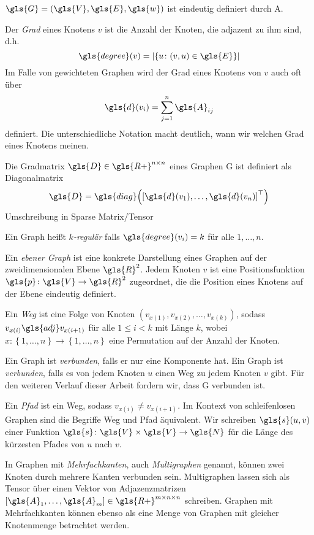 $\gls{G} = \left(\gls{V}, \gls{E}, \gls{w}\right)$ ist eindeutig definiert durch \gls{A}.

Der \emph{Grad} eines Knotens $v$ ist die Anzahl der Knoten, die adjazent zu ihm sind, d.h.
\begin{equation}
  \gls{degree}(v) = \left|\left\{ u \colon \left(v, u\right) \in \gls{E} \right\}\right|
\end{equation}
Im Falle von gewichteten Graphen wird der Grad eines Knotens von $v$ auch oft über
\begin{equation}
  \gls{d}\left(v_i\right) = \sum^n_{j=1} \gls{A}_{ij}
\end{equation}
definiert.
Die unterschiedliche Notation macht deutlich, wann wir welchen Grad eines Knotens meinen.

Die Gradmatrix $\gls{D} \in \gls{R+}^{n \times n}$ eines Graphen \gls{G} ist definiert als Diagonalmatrix
\begin{equation}
  \gls{D} = \gls{diag}\left( {\left[ \gls{d}\left(v_1\right), \ldots, \gls{d}\left(v_n\right) \right]}^{\top} \right)
\end{equation}
Umschreibung in Sparse Matrix/Tensor

Ein Graph heißt \emph{$k$-regulär} falls $\gls{degree}\left(v_i\right) = k$ für alle $1, \ldots, n$.

Ein \emph{ebener Graph} ist eine konkrete Darstellung eines Graphen auf der zweidimensionalen Ebene $\gls{R}^2$.
Jedem Knoten $v$ ist eine Positionsfunktion $\gls{p} \colon \gls{V} \to \gls{R}^2$ zugeordnet, die die Position eines Knotens auf der Ebene eindeutig definiert.

Ein \emph{Weg} ist eine Folge von Knoten $\left( v_{x\left(1\right)}, v_{x\left(2\right)}, \ldots, v_{x\left(k\right)} \right)$, sodass $v_{x\left(i\right)} \gls{adj} v_{x\left(i+1\right)}$ für alle $1 \leq i < k$ mit Länge $k$, wobei $x \colon \left\{ 1, \ldots, n \right\} \to \left\{ 1, \ldots, n \right\}$ eine Permutation auf der Anzahl der Knoten.

Ein Graph ist \emph{verbunden}, falls er nur eine Komponente hat.
Ein Graph ist \emph{verbunden}, falls es von jedem Knoten $u$ einen Weg zu jedem Knoten $v$ gibt.
Für den weiteren Verlauf dieser Arbeit fordern wir, dass \gls{G} verbunden ist.\

Ein \emph{Pfad} ist ein Weg, sodass $v_{x\left(i\right)} \neq v_{x\left(i+1\right)}$.
Im Kontext von schleifenlosen Graphen sind die Begriffe Weg und Pfad äquivalent.
Wir schreiben $\gls{s}\left(u, v\right)$ einer Funktion $\gls{s} \colon \gls{V} \times \gls{V} \to \gls{N}$ für die Länge des kürzesten Pfades von $u$ nach $v$.

In Graphen mit \emph{Mehrfachkanten}, auch \emph{Multigraphen} genannt, können zwei Knoten durch mehrere Kanten verbunden sein.
Multigraphen lassen sich als Tensor über einen Vektor von Adjazenzmatrizen $\left[\gls{A}_1, \ldots, \gls{A}_m\right] \in \gls{R+}^{m \times n \times n}$ schreiben.
Graphen mit Mehrfachkanten können ebenso als eine Menge von Graphen mit gleicher Knotenmenge betrachtet werden.

